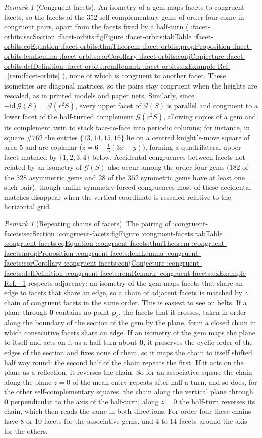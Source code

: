\documentclass[11pt,a4paper]{article}
\makeatletter
\def\Cref@getprefix#1:#2\relax{#1}
\def\Cref@prefix@sec{sec}
\def\Cref@prefix@fig{fig}
\def\Cref@prefix@tab{tab}
\def\Cref@prefix@eq{eq}
\def\Cref@prefix@thm{thm}
\def\Cref@prefix@prop{prop}
\def\Cref@prefix@lem{lem}
\def\Cref@prefix@cor{cor}
\def\Cref@prefix@conj{conj}
\def\Cref@prefix@def{def}
\def\Cref@prefix@rem{rem}
\def\Cref@prefix@ex{ex}
\def\Cref@type@cap#1{%
  \edef\Cref@tmp{#1}%
  \ifx\Cref@tmp\Cref@prefix@sec Section%
  \else\ifx\Cref@tmp\Cref@prefix@fig Figure%
  \else\ifx\Cref@tmp\Cref@prefix@tab Table%
  \else\ifx\Cref@tmp\Cref@prefix@eq Equation%
  \else\ifx\Cref@tmp\Cref@prefix@thm Theorem%
  \else\ifx\Cref@tmp\Cref@prefix@prop Proposition%
  \else\ifx\Cref@tmp\Cref@prefix@lem Lemma%
  \else\ifx\Cref@tmp\Cref@prefix@cor Corollary%
  \else\ifx\Cref@tmp\Cref@prefix@conj Conjecture%
  \else\ifx\Cref@tmp\Cref@prefix@def Definition%
  \else\ifx\Cref@tmp\Cref@prefix@rem Remark%
  \else\ifx\Cref@tmp\Cref@prefix@ex Example%
  \else Ref.%
  \fi\fi\fi\fi\fi\fi\fi\fi\fi\fi\fi\fi
}
\DeclareRobustCommand{\Cref}[1]{%
  \begingroup
  \edef\Cref@label{#1}%
  \edef\Cref@prefix{\expandafter\Cref@getprefix\Cref@label:\relax}%
  \hyperref[#1]{\Cref@type@cap{\Cref@prefix}~\ref*{#1}}%
  \endgroup
}
\theoremstyle{plain}
\theoremstyle{definition}
\theoremstyle{remark}
\newtheorem{remark}[theorem]{Remark}
\makeatother
\begin{document}
\begin{remark}[Congruent facets]
\label{rem:congruent-facets}
An isometry of a gem maps facets to congruent facets, so the facets of the $352$ self-complementary gems of order four come in congruent pairs, apart from the facets fixed by a half-turn (\Cref{rem:facet-orbits}), none of which is congruent to another facet.
These isometries are diagonal matrices, so the pairs stay congruent when the heights are rescaled, as in printed models and paper nets.
Similarly, since $-\mathrm{id}\,\mathcal G(S)=\mathcal G(r^2\overline S)$, every upper facet of $\mathcal G(S)$ is parallel and congruent to a lower facet of the half-turned complement $\mathcal G(r^2\overline S)$, allowing copies of a gem and its complement twin to stack face-to-face into periodic columns; for instance, in square $\#762$ the entries $\{13,14,15,16\}$ lie on a centred knight's-move square of area $5$ and are coplanar ($z=6-\frac15(3x-y)$), forming a quadrilateral upper facet matched by $\{1,2,3,4\}$ below.
Accidental congruences between facets not related by an isometry of $\mathcal G(S)$ also occur among the order-four gems ($182$ of the $528$ asymmetric gems and $28$ of the $352$ symmetric gems have at least one such pair), though unlike symmetry-forced congruences most of these accidental matches disappear when the vertical coordinate is rescaled relative to the horizontal grid.
\end{remark}

\begin{remark}[Repeating chains of facets]
\label{rem:belts}
The pairing of \Cref{rem:congruent-facets} respects adjacency: an isometry of the gem maps facets that share an edge to facets that share an edge, so a chain of adjacent facets is matched by a chain of congruent facets in the same order.
This is easiest to see on belts.
If a plane through $\mathbf 0$ contains no point $\mathbf p_c$, the facets that it crosses, taken in order along the boundary of the section of the gem by the plane, form a closed chain in which consecutive facets share an edge.
If an isometry of the gem maps the plane to itself and acts on it as a half-turn about $\mathbf 0$, it preserves the cyclic order of the edges of the section and fixes none of them, so it maps the chain to itself shifted half way round: the second half of the chain repeats the first. If it acts on the plane as a reflection, it reverses the chain.
So for an associative square the chain along the plane $z=0$ of the mean entry repeats after half a turn, and so does, for the other self-complementary squares, the chain along the vertical plane through $\mathbf 0$ perpendicular to the axis of the half-turn; along $z=0$ the half-turn reverses its chain, which then reads the same in both directions.
For order four these chains have $8$ or $10$ facets for the associative gems, and $4$ to $14$ facets around the axis for the others.
\end{remark}
\end{document}
